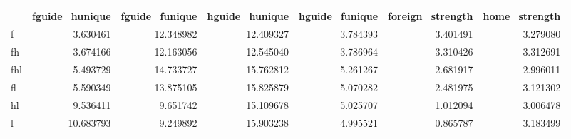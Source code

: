 \begin{tabular}{lrrrrrr}
\toprule
 & fguide_hunique & fguide_funique & hguide_hunique & hguide_funique & foreign_strength & home_strength \\
\midrule
f & 3.630461 & 12.348982 & 12.409327 & 3.784393 & 3.401491 & 3.279080 \\
fh & 3.674166 & 12.163056 & 12.545040 & 3.786964 & 3.310426 & 3.312691 \\
fhl & 5.493729 & 14.733727 & 15.762812 & 5.261267 & 2.681917 & 2.996011 \\
fl & 5.590349 & 13.875105 & 15.825879 & 5.070282 & 2.481975 & 3.121302 \\
hl & 9.536411 & 9.651742 & 15.109678 & 5.025707 & 1.012094 & 3.006478 \\
l & 10.683793 & 9.249892 & 15.903238 & 4.995521 & 0.865787 & 3.183499 \\
\bottomrule
\end{tabular}

